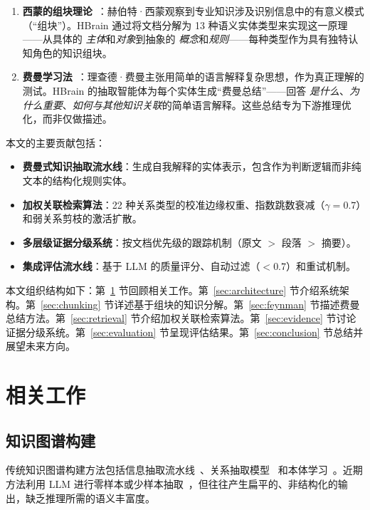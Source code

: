 \documentclass[11pt]{article}
\begin{document}
\begin{enumerate}
    \item \textbf{西蒙的组块理论}~\cite{simon1974chunk}：赫伯特·西蒙观察到专业知识涉及识别信息中的有意义模式（“组块”）。HBrain 通过将文档分解为 13 种语义实体类型来实现这一原理——从具体的 \textit{主体}和\textit{对象}到抽象的 \textit{概念}和\textit{规则}——每种类型作为具有独特认知角色的知识组块。

    \item \textbf{费曼学习法}~\cite{feynman1988pleasure}：理查德·费曼主张用简单的语言解释复杂思想，作为真正理解的测试。HBrain 的抽取智能体为每个实体生成“费曼总结”——回答 \textit{是什么}、\textit{为什么重要}、\textit{如何与其他知识关联}的简单语言解释。这些总结专为下游推理优化，而非仅做描述。
\end{enumerate}

本文的主要贡献包括：

\begin{itemize}
    \item \textbf{费曼式知识抽取流水线}：生成自我解释的实体表示，包含作为判断逻辑而非纯文本的结构化规则实体。
    \item \textbf{加权关联检索算法}：22 种关系类型的校准边缘权重、指数跳数衰减（$\gamma = 0.7$）和弱关系剪枝的激活扩散。
    \item \textbf{多层级证据分级系统}：按文档优先级的跟踪机制（原文 $>$ 段落 $>$ 摘要）。
    \item \textbf{集成评估流水线}：基于 LLM 的质量评分、自动过滤（$< 0.7$）和重试机制。
\end{itemize}

本文组织结构如下：第~\ref{sec:related} 节回顾相关工作。第~\ref{sec:architecture} 节介绍系统架构。第~\ref{sec:chunking} 节详述基于组块的知识分解。第~\ref{sec:feynman} 节描述费曼总结方法。第~\ref{sec:retrieval} 节介绍加权关联检索算法。第~\ref{sec:evidence} 节讨论证据分级系统。第~\ref{sec:evaluation} 节呈现评估结果。第~\ref{sec:conclusion} 节总结并展望未来方向。

\section{相关工作}
\label{sec:related}

\subsection{知识图谱构建}

传统知识图谱构建方法包括信息抽取流水线~\cite{banko2007open}、关系抽取模型~\cite{riedel2010model} 和本体学习~\cite{maedche2001ontology}。近期方法利用 LLM 进行零样本或少样本抽取~\cite{wei2023zero}，但往往产生扁平的、非结构化的输出，缺乏推理所需的语义丰富度。
\end{document}
